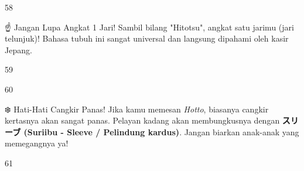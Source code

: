 \begin{convobox}{58}
    \noindent
      

    \vspace{1.5em}
\end{convobox}

\begin{lessonbox}{☝️ Jangan Lupa Angkat 1 Jari!}
    Sambil bilang "Hitotsu", angkat satu jarimu (jari telunjuk)! Bahasa tubuh ini sangat universal dan langsung dipahami oleh kasir Jepang.
\end{lessonbox}

\begin{convobox}{59}
    \noindent
      
     

    \vspace{1.5em}
\end{convobox}

\begin{convobox}{60}
    \noindent

    \vspace{1.5em}
\end{convobox}

\begin{lessonbox}{❄️ Hati-Hati Cangkir Panas!}
    Jika kamu memesan \textit{Hotto}, biasanya cangkir kertasnya akan sangat panas. Pelayan kadang akan membungkusnya dengan \textbf{スリーブ (Suriibu - Sleeve / Pelindung kardus)}. Jangan biarkan anak-anak yang memegangnya ya!
\end{lessonbox}

\begin{convobox}{61}
    \noindent
       
     

    \vspace{1.5em}
\end{convobox}

